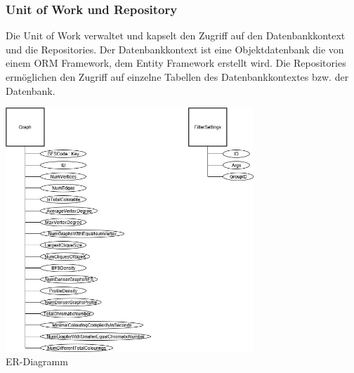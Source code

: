 \documentclass[13pt]{scrreprt}
\begin{document}
	\subsubsection{Unit of Work und Repository}
	Die Unit of Work verwaltet und kapselt den Zugriff auf den Datenbankkontext und die Repositories. Der 				Datenbankkontext ist eine Objektdatenbank die von einem ORM Framework, dem Entity Framework erstellt wird. Die 		Repositories ermöglichen den Zugriff auf einzelne Tabellen des Datenbankkontextes bzw. der Datenbank.
	\\
	\begin{center}	
	\includegraphics[width=0.7\textwidth, angle=0]{DatenbankER.jpg}  	
	\\
	ER-Diagramm
	\\
	\end{center}
\end{document}
